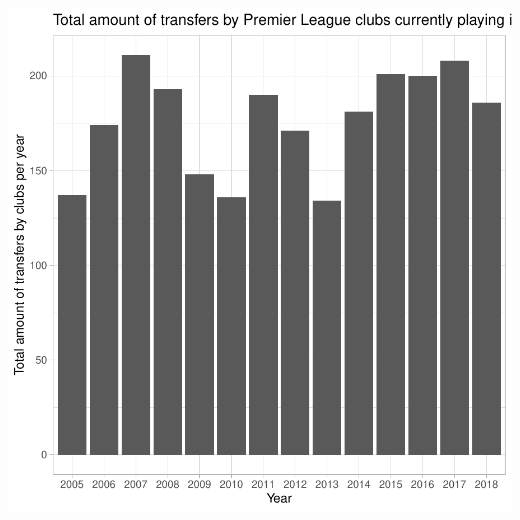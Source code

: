 \documentclass{article}\usepackage[]{graphicx}\usepackage[]{color}
\newenvironment{knitrout}{}{} %
\begin{document}
\begin{knitrout}
{\centering \includegraphics[width=.6\linewidth]{figure/5670721-assignment-eda-Rnwauto-report-3} 

}



\end{knitrout}
\end{document}
